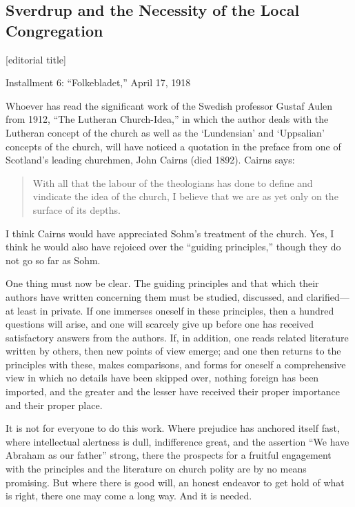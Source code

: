 


\subsection{Sverdrup and the Necessity of the Local Congregation}

[editorial title]

Installment 6: “Folkebladet,” April 17, 1918

Whoever has read the significant work of the Swedish professor Gustaf Aulen from 1912, “The Lutheran Church-Idea,” in which the author deals with the Lutheran concept of the church as well as the ‘Lundensian’ and ‘Uppsalian’ concepts of the church, will have noticed a quotation in the preface from one of Scotland’s leading churchmen, John Cairns (died 1892). Cairns says:

\begin{quote}
With all that the labour of the theologians has done
to define and vindicate the idea of the church, I believe
that we are as yet only on the surface of its depths.
\end{quote}

I think Cairns would have appreciated Sohm’s treatment of the church. Yes, I think he would also have rejoiced over the “guiding principles,” though they do not go so far as Sohm.

One thing must now be clear. The guiding principles and that which their authors have written concerning them must be studied, discussed, and clarified—at least in private. If one immerses oneself in these principles, then a hundred questions will arise, and one will scarcely give up before one has received satisfactory answers from the authors. If, in addition, one reads related literature written by others, then new points of view emerge; and one then returns to the principles with these, makes comparisons, and forms for oneself a comprehensive view in which no details have been skipped over, nothing foreign has been imported, and the greater and the lesser have received their proper importance and their proper place.

It is not for everyone to do this work. Where prejudice has anchored itself fast, where intellectual alertness is dull, indifference great, and the assertion “We have Abraham as our father” strong, there the prospects for a fruitful engagement with the principles and the literature on church polity are by no means promising. But where there is good will, an honest endeavor to get hold of what is right, there one may come a long way. And it is needed.

